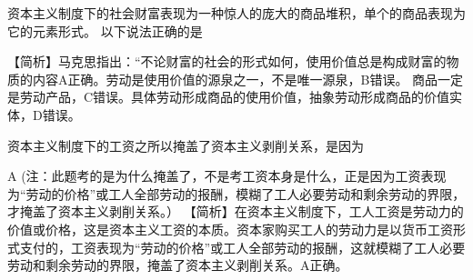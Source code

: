 \question 资本主义制度下的社会财富表现为一种惊人的庞大的商品堆积，单个的商品表现为它的元素形式。
以下说法正确的是
\par{}
\begin{solution}【简析】马克思指出：``不论财富的社会的形式如何，使用价值总是构成财富的物质的内容A正确。劳动是使用价值的源泉之一，不是唯一源泉，B错误。
商品一定是劳动产品，C错误。具体劳动形成商品的使用价值，抽象劳动形成商品的价值实体，D错误。
\end{solution}
\question 资本主义制度下的工资之所以掩盖了资本主义剥削关系，是因为
\par{}
\begin{solution}A
(注：此题考的是为什么掩盖了，不是考工资本身是什么，正是因为工资表现为``劳动的价格''或工人全部劳动的报酬，模糊了工人必要劳动和剩余劳动的界限，才掩盖了资本主义剥削关系。）
【简析】在资本主义制度下，工人工资是劳动力的价值或价格，这是资本主义工资的本质。资本家购买工人的劳动力是以货币工资形式支付的，工资表现为``劳动的价格''或工人全部劳动的报酬，这就模糊了工人必要劳动和剩余劳动的界限，掩盖了资本主义剥削关系。A正确。
\end{solution}
